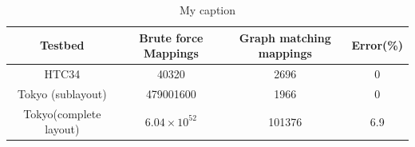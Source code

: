 \begin{table}[]
\centering
\caption{My caption}
\label{tab:resSummary}
\begin{tabular}{|c|c|c|c|}
\hline
Testbed                & Brute force Mappings  & Graph matching mappings & Error(\%) \\ \hline
HTC34                  & 40320                 & 2696                    & 0         \\ \hline
Tokyo (sublayout)      & 479001600             & 1966                     & 0         \\ \hline
Tokyo(complete layout) & $6.04 \times 10^{52}$ & 101376                  & 6.9       \\ \hline
\end{tabular}
\end{table}


















